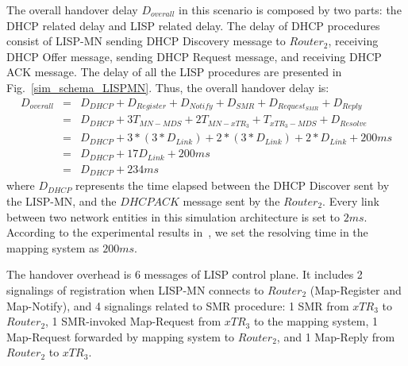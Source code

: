The overall handover delay $D_{overall}$ in this scenario is composed by two parts: the DHCP related delay and LISP related delay. The delay of DHCP procedures consist of LISP-MN sending DHCP Discovery message to $Router_2$, receiving DHCP Offer message, sending DHCP Request message, and receiving DHCP ACK message. The delay of all the LISP procedures are presented in Fig.~\ref{sim_schema_LISPMN}. Thus, the overall handover delay is:
\begin{eqnarray}
D_{overall} &=& D_{DHCP} + D_{Register} + D_{Notify} + D_{SMR} + D_{Request_{SMR}} + D_{Reply} \nonumber \\
&=& D_{DHCP} + 3T_{MN-MDS} + 2T_{MN-xTR_3} + T_{xTR_3-MDS} + D_{Resolve} \nonumber \\
&=& D_{DHCP} + 3* (3*D_{Link}) + 2*(3*D_{Link}) + 2*D_{Link} + 200ms\nonumber \\
&=& D_{DHCP} + 17D_{Link} + 200 ms  \\
&=& D_{DHCP} + 234 ms \nonumber
\end{eqnarray}
where $D_{DHCP}$ represents the time elapsed between the DHCP Discover sent by the LISP-MN, and the $DHCP ACK$ message sent by the $Router_2$. Every link between two network entities in this simulation architecture is set to $2 ms$. According to the experimental results in~\cite{coras2014performance}, we set the resolving time in the mapping system as $200 ms$. %

The handover overhead is 6 messages of LISP control plane. It includes 2 signalings of registration when LISP-MN connects to $Router_2$ (Map-Register and Map-Notify), and 4 signalings related to SMR procedure: 1 SMR from $xTR_3$ to $Router_2$, 1 SMR-invoked Map-Request from $xTR_3$ to the mapping system, 1 Map-Request forwarded by mapping system to $Router_2$, and 1 Map-Reply from $Router_2$ to $xTR_3$.


